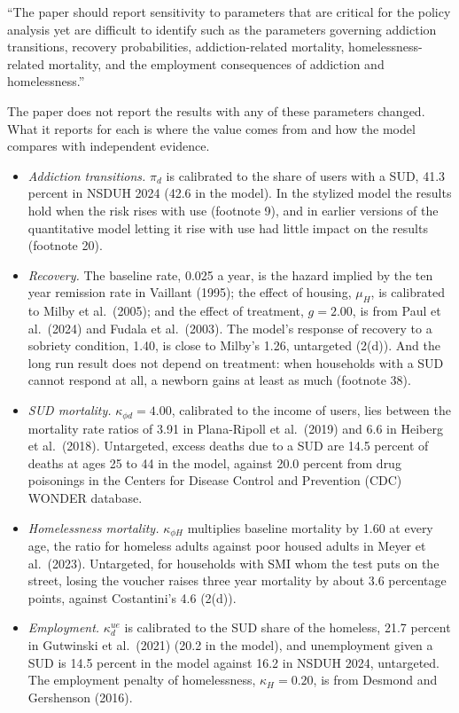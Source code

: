 \documentclass[11pt]{article}
\begin{document}
\begin{referee}
``The paper should report sensitivity to parameters that are critical for the
policy analysis yet are difficult to identify such as the parameters governing
addiction transitions, recovery probabilities, addiction-related mortality,
homelessness-related mortality, and the employment consequences of addiction and
homelessness.''
\end{referee}
\begin{response}
\open The paper does not report the results with any of these parameters changed.
What it reports for each is where the value comes from and how the model compares
with independent evidence.

\begin{itemize}
\item \emph{Addiction transitions.} $\pi_d$ is calibrated to the share of users
with a SUD, 41.3 percent in NSDUH 2024 (42.6 in the model). In the stylized model
the results hold when the risk rises with use (footnote 9), and in earlier
versions of the quantitative model letting it rise with use had little impact on
the results (footnote 20).
\item \emph{Recovery.} The baseline rate, 0.025 a year, is the hazard implied by
the ten year remission rate in Vaillant (1995); the effect of housing, $\mu_H$, is
calibrated to Milby et al.\ (2005); and the effect of treatment, $g=2.00$, is
from Paul et al.\ (2024) and Fudala et al.\ (2003). The model's response of
recovery to a sobriety condition, 1.40, is close to Milby's 1.26, untargeted
(2(d)). And the long run result does not depend on treatment: when households
with a SUD cannot respond at all, a newborn gains at least as much (footnote 38).
\item \emph{SUD mortality.} $\kappa_{\phi d}=4.00$, calibrated to the income of
users, lies between the mortality rate ratios of 3.91 in Plana-Ripoll et al.\
(2019) and 6.6 in Heiberg et al.\ (2018). Untargeted, excess deaths due to a SUD
are 14.5 percent of deaths at ages 25 to 44 in the model, against 20.0 percent
from drug poisonings in the Centers for Disease Control and Prevention (CDC)
WONDER database.
\item \emph{Homelessness mortality.} $\kappa_{\phi H}$ multiplies baseline
mortality by 1.60 at every age, the ratio for homeless adults against poor housed
adults in Meyer et al.\ (2023). Untargeted, for households with SMI whom the test
puts on the street, losing the voucher raises three year mortality by about 3.6
percentage points, against Costantini's 4.6 (2(d)).
\item \emph{Employment.} $\kappa^{ue}_{d}$ is calibrated to the SUD share of the
homeless, 21.7 percent in Gutwinski et al.\ (2021) (20.2 in the model), and
unemployment given a SUD is 14.5 percent in the model against 16.2 in NSDUH 2024,
untargeted. The employment penalty of homelessness, $\kappa_H=0.20$, is from
Desmond and Gershenson (2016).
\end{itemize}


\end{response}
\end{document}

